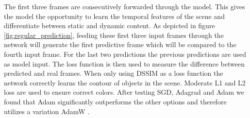 \documentclass[runningheads,a4paper]{llncs}
\begin{document}
The first three frames are consecutively forwarded through the model. This gives the model the opportunity to learn the temporal features of the scene and differentiate between static and dynamic content. As depicted in figure \ref{fig:regular_prediction}, feeding these first three input frames through the network will generate the first predictive frame which will be compared to the fourth input frame. For the last two predictions the previous predictions are used as model input. The loss function is then used to measure the difference between predicted and real frames. When only using DSSIM as a loss function the network correctly learns the contour of objects in the scene. Moderate L1 and L2 loss are used to ensure correct colors. After testing SGD, Adagrad and Adam we found that Adam significantly outperforms the other options and therefore utilizes a variation AdamW \citep{kingma_adam_2014}.
\end{document}
